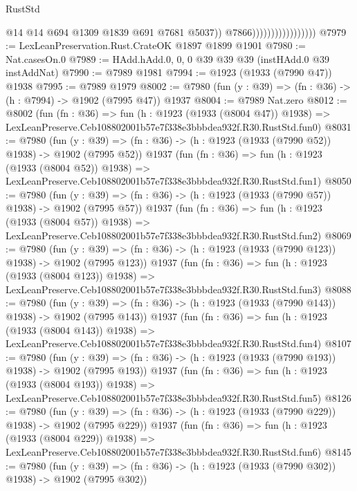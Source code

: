 \begin{lexlean}{RustStd}
\begin{coremodule}
                                          @14
                                          @14
                                          @694
                                          @1309
                                          @1839
                                          @691
                                          @7681
                                          @5037))
                                      @7866)))))))))))))))))
@7979 := LexLeanPreservation.Rust.CrateOK @1897 @1899 @1901
@7980 := Nat.casesOn.{0}
@7989 := HAdd.hAdd.{0, 0, 0} @39 @39 @39 (instHAdd.{0} @39 instAddNat)
@7990 := @7989 @1981
@7994 := @1923 (@1933 (@7990 @47)) @1938
@7995 := @7989 @1979
@8002 := @7980 (fun (y : @39) => (fn : @36) -> (h : @7994) -> @1902 (@7995 @47)) @1937
@8004 := @7989 Nat.zero
@8012 := @8002
    (fun (fn : @36) =>
    fun (h : @1923 (@1933 (@8004 @47)) @1938) =>
    LexLeanPreserve.Ceb108802001b57e7f338e3bbbdea932f.R30.RustStd.fun0)
@8031 := @7980
    (fun (y : @39) => (fn : @36) -> (h : @1923 (@1933 (@7990 @52)) @1938) -> @1902 (@7995 @52))
    @1937
    (fun (fn : @36) =>
    fun (h : @1923 (@1933 (@8004 @52)) @1938) =>
    LexLeanPreserve.Ceb108802001b57e7f338e3bbbdea932f.R30.RustStd.fun1)
@8050 := @7980
    (fun (y : @39) => (fn : @36) -> (h : @1923 (@1933 (@7990 @57)) @1938) -> @1902 (@7995 @57))
    @1937
    (fun (fn : @36) =>
    fun (h : @1923 (@1933 (@8004 @57)) @1938) =>
    LexLeanPreserve.Ceb108802001b57e7f338e3bbbdea932f.R30.RustStd.fun2)
@8069 := @7980
    (fun (y : @39) => (fn : @36) -> (h : @1923 (@1933 (@7990 @123)) @1938) -> @1902 (@7995 @123))
    @1937
    (fun (fn : @36) =>
    fun (h : @1923 (@1933 (@8004 @123)) @1938) =>
    LexLeanPreserve.Ceb108802001b57e7f338e3bbbdea932f.R30.RustStd.fun3)
@8088 := @7980
    (fun (y : @39) => (fn : @36) -> (h : @1923 (@1933 (@7990 @143)) @1938) -> @1902 (@7995 @143))
    @1937
    (fun (fn : @36) =>
    fun (h : @1923 (@1933 (@8004 @143)) @1938) =>
    LexLeanPreserve.Ceb108802001b57e7f338e3bbbdea932f.R30.RustStd.fun4)
@8107 := @7980
    (fun (y : @39) => (fn : @36) -> (h : @1923 (@1933 (@7990 @193)) @1938) -> @1902 (@7995 @193))
    @1937
    (fun (fn : @36) =>
    fun (h : @1923 (@1933 (@8004 @193)) @1938) =>
    LexLeanPreserve.Ceb108802001b57e7f338e3bbbdea932f.R30.RustStd.fun5)
@8126 := @7980
    (fun (y : @39) => (fn : @36) -> (h : @1923 (@1933 (@7990 @229)) @1938) -> @1902 (@7995 @229))
    @1937
    (fun (fn : @36) =>
    fun (h : @1923 (@1933 (@8004 @229)) @1938) =>
    LexLeanPreserve.Ceb108802001b57e7f338e3bbbdea932f.R30.RustStd.fun6)
@8145 := @7980
    (fun (y : @39) => (fn : @36) -> (h : @1923 (@1933 (@7990 @302)) @1938) -> @1902 (@7995 @302))

\end{coremodule}
\end{lexlean}
